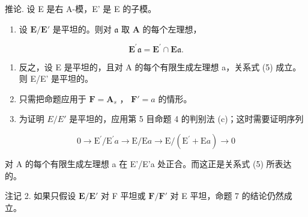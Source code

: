 推论. 设 E 是右 A-模，E' 是 E 的子模。

\begin{enumerate}
\def\labelenumi{(\roman{enumi})}
\tightlist
\item
  设 \(\mathbf{E} / \mathbf{E}'\) 是平坦的。则对 \(\mathfrak{a}\) 取 \(\mathbf{A}\) 的每个左理想，
\end{enumerate}

\[
\mathbf {E} ^ {\prime} \mathfrak {a} = \mathbf {E} ^ {\prime} \cap \mathbf {E} \mathfrak {a}.\tag{5}
\]

\begin{enumerate}
\def\labelenumi{(\roman{enumi})}
\setcounter{enumi}{1}
\item
  反之，设 E 是平坦的，且对 A 的每个有限生成左理想 a，关系式 (5) 成立。则 E/E' 是平坦的。
\item
  只需把命题应用于 \(\mathbf{F} = \mathbf{A}_s\) ， \(\mathbf{F}' = a\) 的情形。
\item
  为证明 \(E/E'\) 是平坦的，应用第 5 目命题 4 的判别法 (c)；这时需要证明序列
\end{enumerate}

\[
0 \rightarrow \mathrm{E} ^ {\prime} / \mathrm{E} ^ {\prime} a \rightarrow \mathrm{E} / \mathrm{E} a \rightarrow \mathrm{E} / (\mathrm{E} ^ {\prime} + \mathrm{E} a) \rightarrow 0
\]

对 A 的每个有限生成左理想 a 在 E'/E'a 处正合。而这正是关系式 (5) 所表达的。

注记 2. 如果只假设 \(\mathbf{E} / \mathbf{E}'\) 对 F 平坦或 \(\mathbf{F} / \mathbf{F}'\) 对 E 平坦，命题 7 的结论仍然成立。

